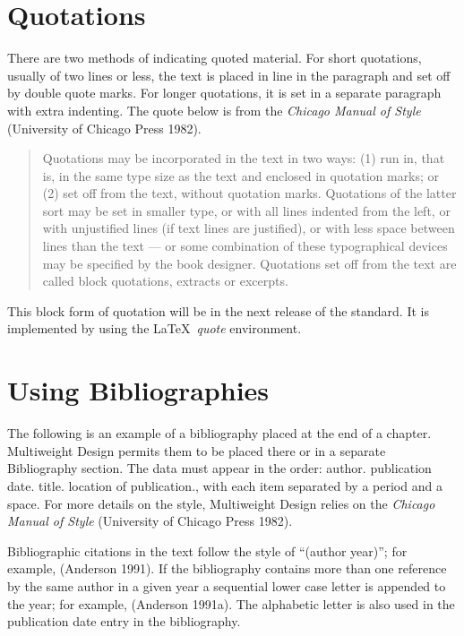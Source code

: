 \section{Quotations}


There are two methods of indicating quoted material. For short
quotations, usually of two lines or less, the text is placed in line
in the paragraph and set off by double quote marks. For longer
quotations, it is set in a separate paragraph with extra indenting.
The quote below is from the {\it Chicago Manual of Style} (University of Chicago Press 1982).

\begin{quote}
Quotations may be incorporated in the text in two ways: (1) run in,
that is, in the same type size as the text and enclosed in quotation
marks; or (2) set off from the text, without quotation marks.
Quotations of the latter sort may be set in smaller type, or with all
lines indented from the left, or with unjustified lines (if text lines
are justified), or with less space between lines than the text --- or
some combination of these typographical devices may be specified by
the book designer. Quotations set off from the text are called block
quotations, extracts or excerpts.
\end{quote}

This block form of quotation will be in the next release of the
standard.  It is implemented by using the \LaTeX\ {\it quote} environment.

\section{Using Bibliographies}

The following is an example of a bibliography placed at the end of a
chapter. Multiweight Design permits them to be placed there or in a
separate Bibliography section. The data must appear in the order:
author. publication date. title. location of publication., with each
item separated by a period and a space. For more details on the style,
Multiweight Design relies on the {\it Chicago Manual of Style}
(University of Chicago Press 1982).


Bibliographic citations in the text follow the style of ``(author
year)''; for example, (Anderson 1991). If the bibliography contains
more than one reference by the same author in a given year a
sequential lower case letter is appended to the year; for example,
(Anderson 1991a). The alphabetic letter is also used in the
publication date entry in the bibliography.


